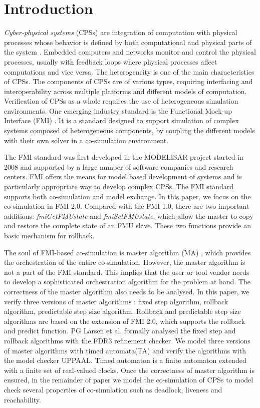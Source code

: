 \section{Introduction}

\textit{Cyber-physical systems} (CPSs)  are integration of computation with physical processes whose behavior is defined by both computational and physical parts of the system \cite{Zanero17}. Embedded computers and networks monitor and control the physical processes, usually with feedback loops where physical processes affect computations and vice versa. The heterogeneity is one of the main characteristics of CPSs. The components of CPSs are of various types, requiring interfacing and interoperability across multiple platforms and different models of computation. Verification of CPSs as a whole requires the use of heterogeneous simulation environments. One emerging industry standard is the Functional Mock-up Interface (FMI) \cite{Blochwitz2011The}\cite{BromanBGLMTW13}. It is a standard designed to support simulation of complex systems composed of heterogeneous components, by coupling the different models with their own solver in a co-simulation environment.

The FMI standard was first developed in the MODELISAR project started in 2008 and supported by a large number of software companies and research centers. FMI offers the means for model based development of systems and is particularly appropriate way to develop complex CPSs. The FMI standard supports both co-simulation and  model exchange. In this paper, we focus on the co-simulation in FMI 2.0.
Compared with the FMI 1.0, there are two important additions: \emph{fmiGetFMUstate} and \emph{fmiSetFMUstate}, which allow the master to copy and restore the complete state of an FMU slave. These two functions provide an basic mechanism for rollback. 

The soul of FMI-based co-simulation is master algorithm (MA) \cite{AckerDVM15}, which provides the orchestration of the entire co-simulation. However, the master algorithm is not a part of the FMI standard. This implies that the user or tool vendor needs to develop a sophisticated orchestration algorithm for the problem at hand. The correctness of the master algorithm also needs to be analysed. In this paper, we verify three versions of master algorithms \cite{BromanBGLMTW13}: fixed step algorithm, rollback algorithm, predictable step size algorithm. Rollback and predictable step size algorithms are based on the extension of FMI 2.0, which supports the rollback and predict function. PG Larsen et al. \cite{Larsen2016Integrated} formally analysed the fixed step and rollback algorithms with the FDR3 refinement checker. We model three versions of master algorithms with timed automata(TA) \cite{BehrmannDLHPYH06} and verify the algorithms with the model checker UPPAAL. Timed automaton is a finite automaton extended with a finite set of real-valued clocks. 
Once the correctness of master algorithm is ensured, in the remainder of paper we model the co-simulation of CPSs to model check several properties of co-simulation such as deadlock, liveness and reachability. 

